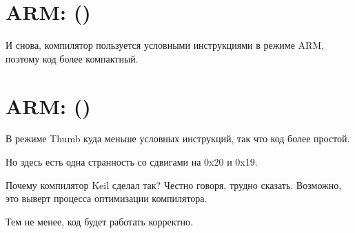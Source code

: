 ﻿\section{ARM: \OptimizingKeilVI (\ARMMode)}

И снова, компилятор пользуется условными инструкциями в режиме ARM, поэтому код более 
компактный.



\section{ARM: \OptimizingKeilVI (\ThumbMode)}
\myindex{\CompilerAnomaly}
\label{Keil_anomaly}

В режиме Thumb куда меньше условных инструкций, так что код более простой.

Но здесь есть одна странность со сдвигами на 0x20 и 0x19.

Почему компилятор Keil сделал так?
Честно говоря, трудно сказать.
Возможно, это выверт процесса оптимизации компилятора.

Тем не менее, код будет работать корректно.



